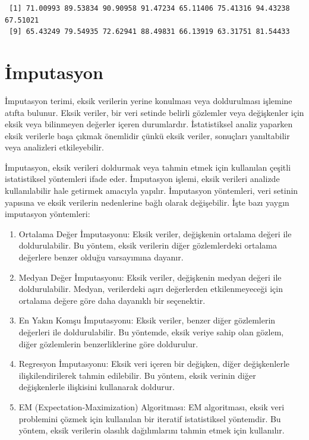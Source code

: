 \documentclass[
  letterpaper,
  DIV=11,
  numbers=noendperiod]{scrreprt}
\begin{document}
\begin{verbatim}
 [1] 71.00993 89.53834 90.90958 91.47234 65.11406 75.41316 94.43238 67.51021
 [9] 65.43249 79.54935 72.62941 88.49831 66.13919 63.31751 81.54433
\end{verbatim}

\hypertarget{imputasyon}{%
\section*{İmputasyon}\label{imputasyon}}


İmputasyon terimi, eksik verilerin yerine konulması veya doldurulması
işlemine atıfta bulunur. Eksik veriler, bir veri setinde belirli
gözlemler veya değişkenler için eksik veya bilinmeyen değerler içeren
durumlardır. İstatistiksel analiz yaparken eksik verilerle başa çıkmak
önemlidir çünkü eksik veriler, sonuçları yanıltabilir veya analizleri
etkileyebilir.

İmputasyon, eksik verileri doldurmak veya tahmin etmek için kullanılan
çeşitli istatistiksel yöntemleri ifade eder. İmputasyon işlemi, eksik
verileri analizde kullanılabilir hale getirmek amacıyla yapılır.
İmputasyon yöntemleri, veri setinin yapısına ve eksik verilerin
nedenlerine bağlı olarak değişebilir. İşte bazı yaygın imputasyon
yöntemleri:

\begin{enumerate}
\def\labelenumi{\arabic{enumi}.}
\item
  Ortalama Değer İmputasyonu: Eksik veriler, değişkenin ortalama değeri
  ile doldurulabilir. Bu yöntem, eksik verilerin diğer gözlemlerdeki
  ortalama değerlere benzer olduğu varsayımına dayanır.
\item
  Medyan Değer İmputasyonu: Eksik veriler, değişkenin medyan değeri ile
  doldurulabilir. Medyan, verilerdeki aşırı değerlerden etkilenmeyeceği
  için ortalama değere göre daha dayanıklı bir seçenektir.
\item
  En Yakın Komşu İmputasyonu: Eksik veriler, benzer diğer gözlemlerin
  değerleri ile doldurulabilir. Bu yöntemde, eksik veriye sahip olan
  gözlem, diğer gözlemlerin benzerliklerine göre doldurulur.
\item
  Regresyon İmputasyonu: Eksik veri içeren bir değişken, diğer
  değişkenlerle ilişkilendirilerek tahmin edilebilir. Bu yöntem, eksik
  verinin diğer değişkenlerle ilişkisini kullanarak doldurur.
\item
  EM (Expectation-Maximization) Algoritması: EM algoritması, eksik veri
  problemini çözmek için kullanılan bir iteratif istatistiksel
  yöntemdir. Bu yöntem, eksik verilerin olasılık dağılımlarını tahmin
  etmek için kullanılır.
\end{enumerate}
\end{document}
